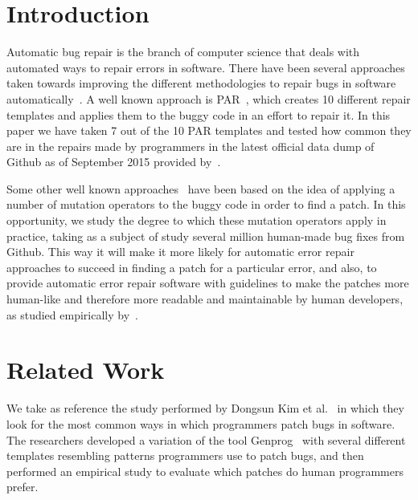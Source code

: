 \documentclass{sig-alternate-05-2015}
\begin{document}
%
%
\printccsdesc



\section{Introduction}

Automatic bug repair is the branch of computer science that deals with automated
ways to repair errors in software. There have been several approaches taken
towards improving the different methodologies to repair bugs in software
automatically~\cite{kim2013,weimer2009,legoues2012,pan2009}. A well known approach is PAR~\cite{kim2013}, which creates 10 different repair templates and applies them to the buggy code in an effort to repair
it. In this paper we have taken 7 out of the 10 PAR templates and tested how
common they are in the repairs made by programmers in the latest official data
dump of Github as of September 2015 provided by~\cite{dyer2013}.

Some other well known approaches~\cite{weimer2009,legoues2012} have been based on the idea of applying a number of mutation operators to the buggy code in order to find a patch. In this opportunity, we study the degree to which these mutation operators apply in practice, taking as a subject of study several million human-made bug fixes from Github. This way it will make it more likely for automatic error repair approaches to succeed in
finding a patch for a particular error, and also, to provide automatic error
repair software with guidelines to make the patches more human-like and
therefore more readable and maintainable by human developers, as studied empirically by~\cite{kim2013}.


\section{Related Work}
We take as reference the study performed by Dongsun Kim et al.~\cite{kim2013} in which they look for the most common ways in which programmers patch bugs in software. The
researchers developed a variation of the tool Genprog~\cite{weimer2009,legoues2012}
with several different templates resembling patterns programmers use to patch
bugs, and then performed an empirical study to evaluate which patches do human programmers prefer.
\end{document}
